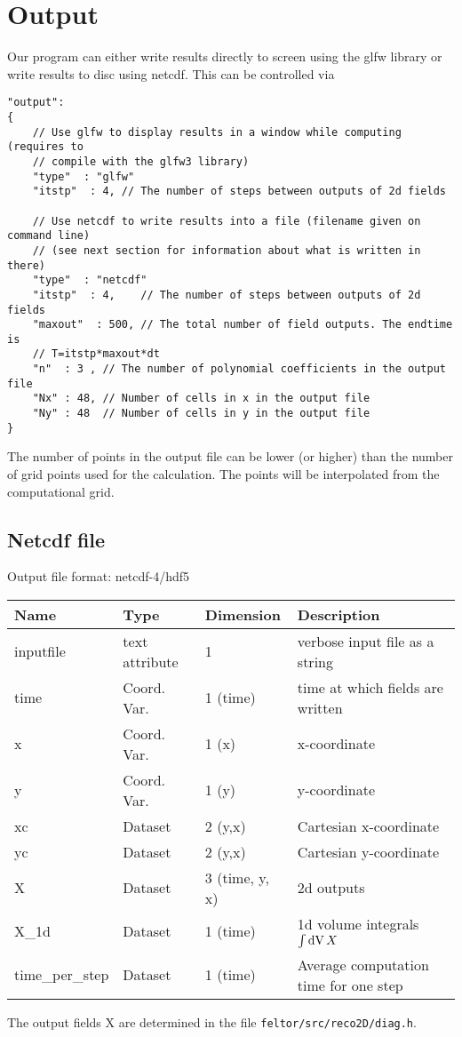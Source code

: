 \section{Output}
Our program can either write results directly to screen using the glfw library
or write results to disc using netcdf.
This can be controlled via
\begin{verbatim}
"output":
{
    // Use glfw to display results in a window while computing (requires to
    // compile with the glfw3 library)
    "type"  : "glfw"
    "itstp"  : 4, // The number of steps between outputs of 2d fields

    // Use netcdf to write results into a file (filename given on command line)
    // (see next section for information about what is written in there)
    "type"  : "netcdf"
    "itstp"  : 4,    // The number of steps between outputs of 2d fields
    "maxout"  : 500, // The total number of field outputs. The endtime is
    // T=itstp*maxout*dt
    "n"  : 3 , // The number of polynomial coefficients in the output file
    "Nx" : 48, // Number of cells in x in the output file
    "Ny" : 48  // Number of cells in y in the output file
}
\end{verbatim}
The number of points in the output file can be lower (or higher) than the number of
grid points used for the calculation. The points will be interpolated from the
computational grid.
\subsection{Netcdf file}
Output file format: netcdf-4/hdf5

\begin{longtable}{lll>{\RaggedRight}p{7cm}}
\toprule
\rowcolor{gray!50}\textbf{Name} &  \textbf{Type} & \textbf{Dimension} & \textbf{Description}  \\ \midrule
inputfile        & text attribute & 1 & verbose input file as a string \\
time             & Coord. Var. & 1 (time) & time at which fields are written \\
x                & Coord. Var. & 1 (x) & x-coordinate  \\
y                & Coord. Var. & 1 (y) & y-coordinate \\
xc               & Dataset & 2 (y,x) & Cartesian x-coordinate  \\
yc               & Dataset & 2 (y,x) & Cartesian y-coordinate \\
X                & Dataset & 3 (time, y, x) & 2d outputs \\
X\_1d            & Dataset & 1 (time) & 1d volume integrals $\int \mathrm{dV}\, X$ \\
time\_per\_step  & Dataset & 1 (time) & Average computation time for one step \\
\bottomrule
\end{longtable}
The output fields X are determined in the file \texttt{feltor/src/reco2D/diag.h}.




